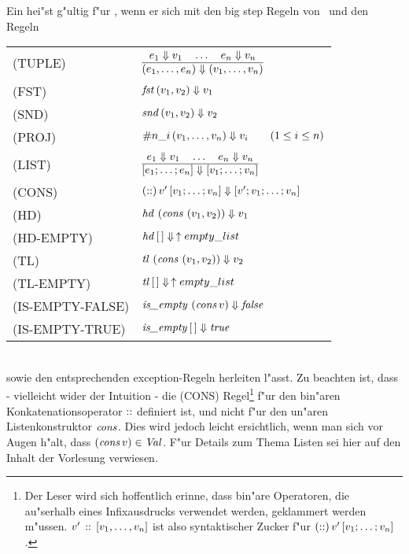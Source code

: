 Ein  hei"st g"ultig f"ur \LTHREE, wenn er sich mit den big step Regeln von \LTWO\ und den Regeln\\[5mm]
  \begin{tabular}{ll}
    \mbox{(TUPLE)}          & $\regel{e_1 \eval v_1 \quad \ldots \quad e_n \eval v_n}
                                     {(e_1,\ldots,e_n) \eval (v_1,\ldots,v_n)}$ \\[5mm]
    \mbox{(FST)}            & ${\text{\it fst\/}}\,(v_1,v_2) \Downarrow v_1$ \\[3mm]
    \mbox{(SND)}            & ${\text{\it snd\/}}\,(v_1,v_2) \Downarrow v_2$ \\[3mm]
    \mbox{(PROJ)}           & $\#n\_i\,(v_1,\ldots,v_n) \Downarrow v_i \qquad (1 \le i \le n)$ \\[3mm]
    \mbox{(LIST)}           & $\regel{e_1 \eval v_1 \quad \ldots \quad e_n \eval v_n}
                                     {[e_1;\ldots;e_n] \eval [v_1;\ldots;v_n]}$ \\[5mm]
    \mbox{(CONS)}           & $(\mathrel{::})\,v'\,[v_1;\ldots;v_n] \Downarrow [v';v_1;\ldots;v_n]$ \\[3mm]
    \mbox{(HD)}             & ${\text{\it hd\/}}\,\left({\text{\it cons\/}}\,\left(v_1,v_2\right)\right) \Downarrow v_1$ \\[3mm]
    \mbox{(HD-EMPTY)}       & ${\text{\it hd\/}}\,[\,] \Downarrow\,\uparrow empty\_list$ \\[3mm]
    \mbox{(TL)}             & ${\text{\it tl\/}}\,\left({\text{\it cons\/}}\,\left(v_1,v_2\right)\right) \Downarrow v_2$ \\[3mm]
    \mbox{(TL-EMPTY)}       & ${\text{\it tl\/}}\,[\,] \Downarrow\,\uparrow empty\_list$ \\[3mm]
    \mbox{(IS-EMPTY-FALSE)} & ${\text{\it is\_empty\/}}\,\left({\text{\it cons\/}}\,v\right) \Downarrow {\text{\it false\/}}$ \\[3mm]
    \mbox{(IS-EMPTY-TRUE)}  & ${\text{\it is\_empty\/}}\,[\,] \Downarrow {\text{\it true\/}}$
  \end{tabular}\\[7mm]
sowie den entsprechenden exception-Regeln herleiten l"asst. Zu beachten ist, dass - vielleicht wider der Intuition - die
(CONS) Regel\footnote{Der Leser wird sich hoffentlich erinne\mbox, dass bin"are Operatoren, die au"serhalb eines Infixausdrucks
verwendet werden, geklammert werden m"ussen. $v'\,\mathrel{::}\,[v_1,\ldots,v_n]$ ist also syntaktischer Zucker f"ur
$(\mathrel{::})\,v'\,[v_1;\ldots;v_n]$.} f"ur den bin"aren Konkatenationsoperator $\mathrel{::}$ definiert ist, und nicht f"ur den
un"aren Listenkonstruktor ${\text{\it cons\/}}$. Dies wird jedoch leicht ersichtlich, wenn man sich vor Augen h"alt, dass $({\text{\it cons\/}}\,v) \in {\text{\it Val\/}}$.
F"ur Details zum Thema Listen sei hier auf den Inhalt der Vorlesung verwiesen.


